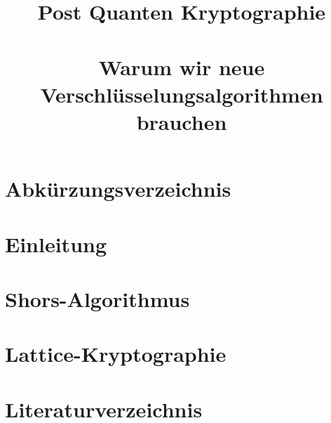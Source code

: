 \documentclass[conference]{IEEEtran}
\begin{document}

\title{Post Quanten Kryptographie\\
\large \ \\ \large Warum wir neue Verschlüsselungsalgorithmen brauchen}

\author{

  \and

}

\maketitle



\listoffigures
{}

\section*{Abkürzungsverzeichnis}


\section{Einleitung}


\section{Shors-Algorithmus}


\section{Lattice-Kryptographie}


%

\section*{Literaturverzeichnis}
\printbibliography[heading=none]{}
\end{document}
